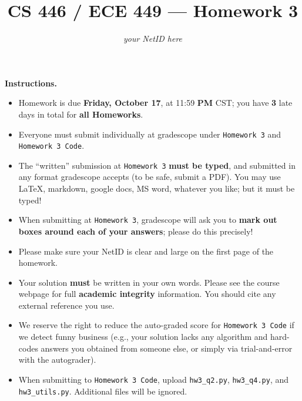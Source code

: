 \documentclass{article}
\title{CS 446 / ECE 449 --- Homework 3}
\author{\emph{your NetID here}}
\date{}
\theoremstyle{definition}
\theoremstyle{remark}
\begin{document}
    \maketitle
    
    \noindent\textbf{Instructions.}
    \begin{itemize}
      \item
        Homework is due \textbf{Friday, October 17}, at 11:59 \textbf{PM} CST; you have \textbf{3} late days in total for \textbf{all Homeworks}.
        
      \item
        Everyone must submit individually at gradescope under \texttt{Homework 3} and \texttt{Homework 3 Code}.
    
      \item
        The ``written'' submission at \texttt{Homework 3} \textbf{must be typed}, and submitted in
        any format gradescope accepts (to be safe, submit a PDF).  You may use \LaTeX, markdown,
        google docs, MS word, whatever you like; but it must be typed!
    
      \item
        When submitting at \texttt{Homework 3}, gradescope will ask you to \textbf{mark out boxes
        around each of your answers}; please do this precisely!
    
      \item
        Please make sure your NetID is clear and large on the first page of the homework.
    
      \item
        Your solution \textbf{must} be written in your own words.
        Please see the course webpage for full \textbf{academic integrity} information.
        You should cite any external reference you use.
    
      \item
        We reserve the right to reduce the auto-graded score for
        \texttt{Homework 3 Code} if we detect funny business (e.g., your solution
        lacks any algorithm and hard-codes answers you obtained from
        someone else, or simply via trial-and-error with the autograder).
        
      \item
       When submitting to \texttt{Homework 3 Code}, upload \texttt{hw3\_q2.py}, \texttt{hw3\_q4.py}, and \texttt{hw3\_utils.py}. Additional files will be ignored.
       
    \end{itemize}
        
\end{document}

